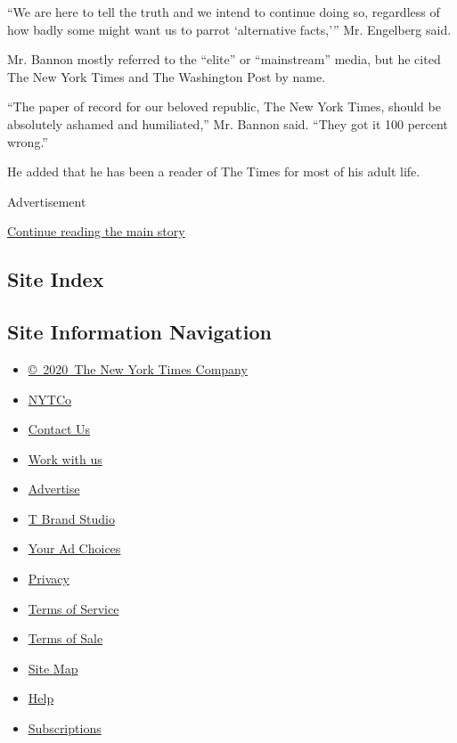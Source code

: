 ``We are here to tell the truth and we intend to continue doing so,
regardless of how badly some might want us to parrot `alternative
facts,''' Mr. Engelberg said.

Mr. Bannon mostly referred to the ``elite'' or ``mainstream'' media, but
he cited The New York Times and The Washington Post by name.

``The paper of record for our beloved republic, The New York Times,
should be absolutely ashamed and humiliated,'' Mr. Bannon said. ``They
got it 100 percent wrong.''

He added that he has been a reader of The Times for most of his adult
life.

Advertisement

\protect\hyperlink{after-bottom}{Continue reading the main story}

\hypertarget{site-index}{%
\subsection{Site Index}\label{site-index}}

\hypertarget{site-information-navigation}{%
\subsection{Site Information
Navigation}\label{site-information-navigation}}

\begin{itemize}
\tightlist
\item
  \href{https://help.nytimes.com/hc/en-us/articles/115014792127-Copyright-notice}{©~2020~The
  New York Times Company}
\end{itemize}

\begin{itemize}
\tightlist
\item
  \href{https://www.nytco.com/}{NYTCo}
\item
  \href{https://help.nytimes.com/hc/en-us/articles/115015385887-Contact-Us}{Contact
  Us}
\item
  \href{https://www.nytco.com/careers/}{Work with us}
\item
  \href{https://nytmediakit.com/}{Advertise}
\item
  \href{http://www.tbrandstudio.com/}{T Brand Studio}
\item
  \href{https://www.nytimes.com/privacy/cookie-policy\#how-do-i-manage-trackers}{Your
  Ad Choices}
\item
  \href{https://www.nytimes.com/privacy}{Privacy}
\item
  \href{https://help.nytimes.com/hc/en-us/articles/115014893428-Terms-of-service}{Terms
  of Service}
\item
  \href{https://help.nytimes.com/hc/en-us/articles/115014893968-Terms-of-sale}{Terms
  of Sale}
\item
  \href{https://spiderbites.nytimes.com}{Site Map}
\item
  \href{https://help.nytimes.com/hc/en-us}{Help}
\item
  \href{https://www.nytimes.com/subscription?campaignId=37WXW}{Subscriptions}
\end{itemize}
